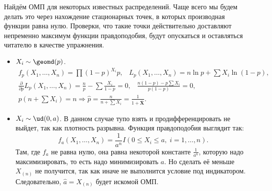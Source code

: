 \begin{example}\label{mle_example}
    Найдём ОМП для некоторых известных распределений. Чаще всего мы будем делать это через нахождение стационарных точек, в которых производная функции равна нулю. Проверки, что такие точки действительно доставляют непременно максимум функции правдоподобия, будут опускаться и оставляться читателю в качестве упражнения.
    \begin{itemize}
        \item $X_i \sim \geomd(p)$.
        \begin{gather*}
        f_{p}(X_1, \ldots, X_n) = \prod (1-p)^{X_i}p,\;\;\;L_{p}(X_1, \ldots, X_n) = n\ln{p} + \sum X_i\ln{(1-p)},\\
        \frac{\partial}{\partial p}L_{p}(X_1, \ldots, X_n) = \frac{n}{p} - \sum \frac{X_i}{1 - p} = 0,\;\;\; \frac{n(1-p)-p\sum X_i}{p(1-p)}=0,\\
        p\left(n + \sum X_i\right) = n \Longrightarrow \widehat{p} = \frac{n}{n + \sum X_i} = \frac{1}{1 + \overline{\mathbf X}}.
        \end{gather*}
        
        \item $X_i \sim \ud(0, a)$. В данном случае тупо взять и продифференцировать не выйдет, так как плотность разрывна. Функция правдоподобия выглядит так:
    \[
    f_{a}(X_1, \ldots, X_n) = \frac{1}{a^n}I(0 \le X_i \le a,\; i = 1,\ldots, n).
    \]
    Там, где $f_{a}$ не равна нулю, она равна некоторой константе $\frac{1}{a^n}$, которую надо максимизировать, то есть надо минимизировать $a$. Но сделать её меньше $X_{(n)}$ не получится, так как иначе не выполнится условие под индикатором. Следовательно, $\widehat{a} = X_{(n)}$ будет искомой ОМП.


\end{itemize}
\end{example}
